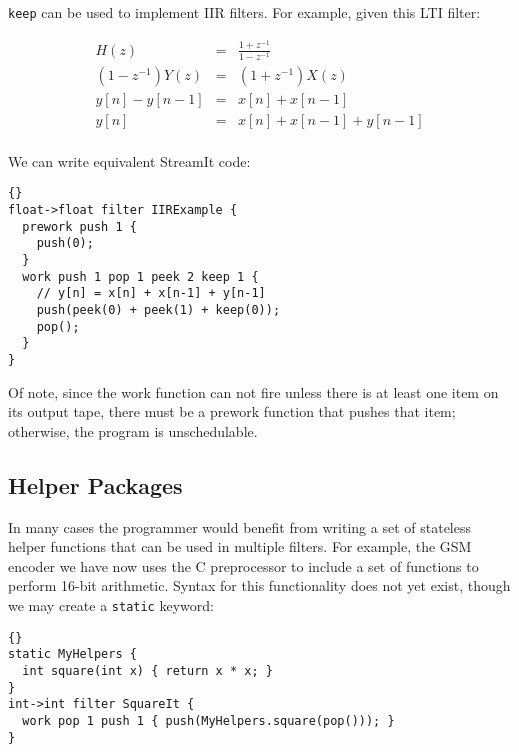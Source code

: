 \documentclass[11pt]{article}
\begin{document}
\lstinline|keep| can be used to implement IIR filters.  For example,
given this LTI filter:

\begin{eqnarray*}
H(z) & = & \frac{1+z^{-1}}{1-z^{-1}} \\
(1-z^{-1}) Y(z) & = & (1+z^{-1}) X(z) \\
y[n] - y[n-1] & = & x[n] + x[n-1] \\
y[n] & = & x[n] + x[n-1] + y[n-1] \\
\end{eqnarray*}

We can write equivalent StreamIt code:

\begin{lstlisting}{}
float->float filter IIRExample {
  prework push 1 {
    push(0);
  }
  work push 1 pop 1 peek 2 keep 1 {
    // y[n] = x[n] + x[n-1] + y[n-1]
    push(peek(0) + peek(1) + keep(0));
    pop();
  }
}
\end{lstlisting}

Of note, since the work function can not fire unless there is at least
one item on its output tape, there must be a prework function that
pushes that item; otherwise, the program is unschedulable.

\subsection{Helper Packages}

In many cases the programmer would benefit from writing a set of
stateless helper functions that can be used in multiple filters.  For
example, the GSM encoder we have now uses the C preprocessor to
include a set of functions to perform 16-bit arithmetic.  Syntax for
this functionality does not yet exist, though we may create a
\lstinline|static| keyword:

\begin{lstlisting}{}
static MyHelpers {
  int square(int x) { return x * x; }
}
int->int filter SquareIt {
  work pop 1 push 1 { push(MyHelpers.square(pop())); }
}
\end{lstlisting}

%


\end{document}
